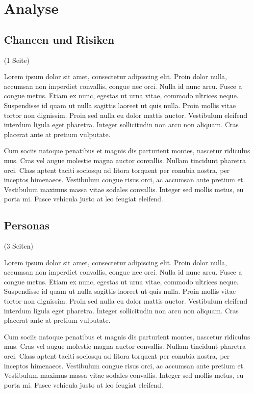 \chapter{Analyse}
\label{chap:analyse}

\section{Chancen und Risiken}
\label{sec:chances}

(1 Seite)

Lorem ipsum dolor sit amet, consectetur adipiscing elit. Proin dolor nulla, accumsan non imperdiet convallis, congue nec orci. Nulla id nunc arcu. Fusce a congue metus. Etiam ex nunc, egestas ut urna vitae, commodo ultrices neque. Suspendisse id quam ut nulla sagittis laoreet ut quis nulla. Proin mollis vitae tortor non dignissim. Proin sed nulla eu dolor mattis auctor. Vestibulum eleifend interdum ligula eget pharetra. Integer sollicitudin non arcu non aliquam. Cras placerat ante at pretium vulputate.

Cum sociis natoque penatibus et magnis dis parturient montes, nascetur ridiculus mus. Cras vel augue molestie magna auctor convallis. Nullam tincidunt pharetra orci. Class aptent taciti sociosqu ad litora torquent per conubia nostra, per inceptos himenaeos. Vestibulum congue risus orci, ac accumsan ante pretium et. Vestibulum maximus massa vitae sodales convallis. Integer sed mollis metus, eu porta mi. Fusce vehicula justo at leo feugiat eleifend.

\clearpage
\section{Personas}
\label{sec:personas}

(3 Seiten)

Lorem ipsum dolor sit amet, consectetur adipiscing elit. Proin dolor nulla, accumsan non imperdiet convallis, congue nec orci. Nulla id nunc arcu. Fusce a congue metus. Etiam ex nunc, egestas ut urna vitae, commodo ultrices neque. Suspendisse id quam ut nulla sagittis laoreet ut quis nulla. Proin mollis vitae tortor non dignissim. Proin sed nulla eu dolor mattis auctor. Vestibulum eleifend interdum ligula eget pharetra. Integer sollicitudin non arcu non aliquam. Cras placerat ante at pretium vulputate.

Cum sociis natoque penatibus et magnis dis parturient montes, nascetur ridiculus mus. Cras vel augue molestie magna auctor convallis. Nullam tincidunt pharetra orci. Class aptent taciti sociosqu ad litora torquent per conubia nostra, per inceptos himenaeos. Vestibulum congue risus orci, ac accumsan ante pretium et. Vestibulum maximus massa vitae sodales convallis. Integer sed mollis metus, eu porta mi. Fusce vehicula justo at leo feugiat eleifend.


